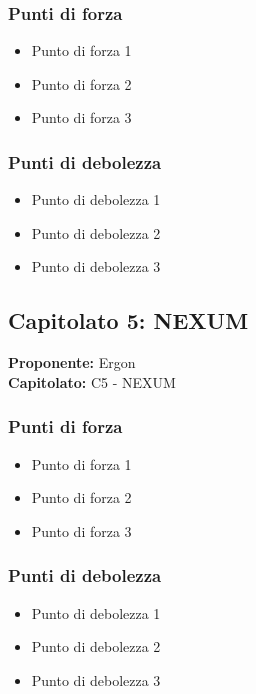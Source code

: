 \documentclass[a4paper,12pt]{article}
\begin{document}
\subsubsection{Punti di forza}
\begin{itemize}
\item Punto di forza 1
\item Punto di forza 2
\item Punto di forza 3
\end{itemize}

\subsubsection{Punti di debolezza}
\begin{itemize}
\item Punto di debolezza 1
\item Punto di debolezza 2
\item Punto di debolezza 3
\end{itemize}

\subsection{Capitolato 5: NEXUM}

\begin{tcolorbox}[colback=lightgray!30,colframe=darkgray,arc=2mm,boxrule=0.3pt]
\textbf{Proponente:} Ergon \\
\textbf{Capitolato:} C5 - NEXUM
\end{tcolorbox}

\subsubsection{Punti di forza}
\begin{itemize}
\item Punto di forza 1
\item Punto di forza 2
\item Punto di forza 3
\end{itemize}

\subsubsection{Punti di debolezza}
\begin{itemize}
\item Punto di debolezza 1
\item Punto di debolezza 2
\item Punto di debolezza 3
\end{itemize}
\end{document}
